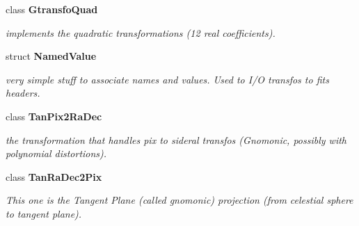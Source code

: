 \begin{CompactItemize}
class {\bf Gtransfo\-Quad}
\begin{CompactList}\small\item\em implements the quadratic transformations (12 real coefficients).\item\end{CompactList}\item 
struct {\bf Named\-Value}
\begin{CompactList}\small\item\em very simple stuff to associate names and values. Used to I/O transfos to fits headers.\item\end{CompactList}\item 
class {\bf Tan\-Pix2Ra\-Dec}
\begin{CompactList}\small\item\em the transformation that handles pix to sideral transfos (Gnomonic, possibly with polynomial distortions).\item\end{CompactList}\item 
class {\bf Tan\-Ra\-Dec2Pix}
\begin{CompactList}\small\item\em This one is the Tangent Plane (called gnomonic) projection (from celestial sphere to tangent plane).\item\end{CompactList}\end{CompactItemize}
